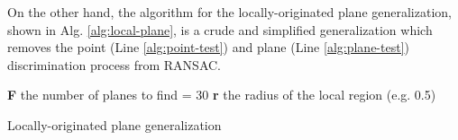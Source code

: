 \begin{appendix}
On the other hand, the algorithm for the locally-originated plane generalization, shown in Alg. \ref{alg:local-plane}, is a crude and simplified generalization which removes the point (Line \ref{alg:point-test}) and plane (Line \ref{alg:plane-test}) discrimination process from RANSAC.

\begin{algorithm}[t]
    \small
	\DontPrintSemicolon
	\textbf{F} the number of planes to find = 30\;
	\textbf{r} the radius of the local region (e.g. 0.5)\;
	
	\BlankLine
	\caption{Locally-originated plane generalization}
	\label{alg:local-plane}
\end{algorithm}

\end{appendix}


